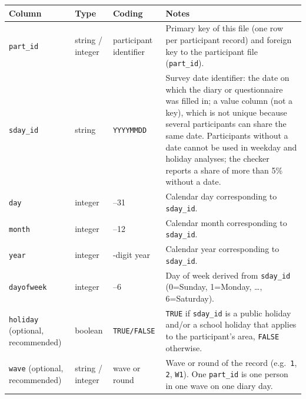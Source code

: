 \documentclass[11pt,a4paper]{article}
\begin{document}
\begin{enumerate}
    \begin{table}[H]
    \centering
    \begin{tabularx}{\textwidth}{>{\raggedright\arraybackslash}p{2.5cm} >{\raggedright\arraybackslash}p{1.8cm} >{\raggedright\arraybackslash}p{2.3cm} X}
    \toprule
    \textbf{Column} & \textbf{Type} & \textbf{Coding} & \textbf{Notes} \\
    \midrule
    \texttt{part\_id} &
    string / integer &
    participant identifier &
    Primary key of this file (one row per participant record) and foreign key to the participant file (\texttt{part\_id}). \\

    \texttt{sday\_id} &
    string &
    \texttt{YYYYMMDD} &
    Survey date identifier: the date on which the diary or questionnaire was filled in; a value column (not a key), which is not unique because several participants can share the same date. Participants without a date cannot be used in weekday and holiday analyses; the checker reports a share of more than 5\% without a date. \\
    
    \texttt{day} &
    integer &
    1--31 &
    Calendar day corresponding to \texttt{sday\_id}. \\
    
    \texttt{month} &
    integer &
    1--12 &
    Calendar month corresponding to \texttt{sday\_id}. \\
    
    \texttt{year} &
    integer &
    4-digit year &
    Calendar year corresponding to \texttt{sday\_id}. \\
    
    \texttt{dayofweek} &
    integer &
    0--6 &
    Day of week derived from \texttt{sday\_id} (0=Sunday, 1=Monday, \ldots, 6=Saturday). \\

    \texttt{holiday} (optional, recommended) &
    boolean &
    \texttt{TRUE/FALSE} &
    \texttt{TRUE} if \texttt{sday\_id} is a public holiday and/or a school holiday that applies to the participant's area, \texttt{FALSE} otherwise. \\

    \texttt{wave} (optional, recommended) &
    string / integer &
    wave or round &
    Wave or round of the record (e.g.\ \texttt{1}, \texttt{2}, \texttt{W1}). One \texttt{part\_id} is one person in one wave on one diary day. \\


\end{tabularx}
\end{table}
\end{enumerate}
\end{document}
